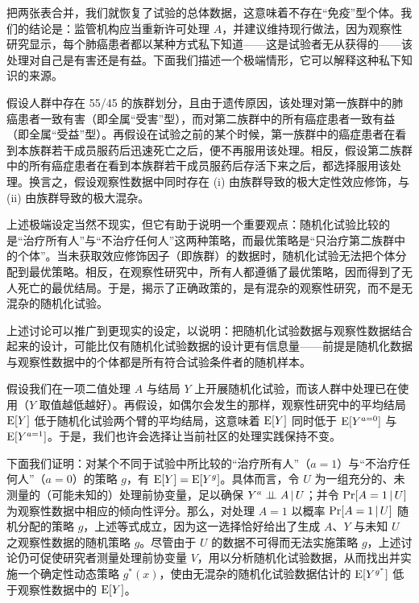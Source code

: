 \begin{finepoint}[随机化试验与观察性研究的一个反直觉比较]
把两张表合并，我们就恢复了试验的总体数据，这意味着不存在“免疫”型个体。我们的结论是：监管机构应当重新许可处理 $A$，并建议维持现行做法，因为观察性研究显示，每个肺癌患者都以某种方式私下知道——这是试验者无从获得的——该处理对自己是有害还是有益。下面我们描述一个极端情形，它可以解释这种私下知识的来源。

假设人群中存在 55/45 的族群划分，且由于遗传原因，该处理对第一族群中的肺癌患者一致有害（即全属“受害”型），而对第二族群中的所有癌症患者一致有益（即全属“受益”型）。再假设在试验之前的某个时候，第一族群中的癌症患者在看到本族群若干成员服药后迅速死亡之后，便不再服用该处理。相反，假设第二族群中的所有癌症患者在看到本族群若干成员服药后存活下来之后，都选择服用该处理。换言之，假设观察性数据中同时存在 (i) 由族群导致的极大定性效应修饰，与 (ii) 由族群导致的极大混杂。

上述极端设定当然不现实，但它有助于说明一个重要观点：随机化试验比较的是“治疗所有人”与“不治疗任何人”这两种策略，而最优策略是“只治疗第二族群中的个体”。当未获取效应修饰因子（即族群）的数据时，随机化试验无法把个体分配到最优策略。相反，在观察性研究中，所有人都遵循了最优策略，因而得到了无人死亡的最优结局。于是，揭示了正确政策的，是有混杂的观察性研究，而不是无混杂的随机化试验。
\end{finepoint}

\begin{finepoint}
上述讨论可以推广到更现实的设定，以说明：把随机化试验数据与观察性数据结合起来的设计，可能比仅有随机化试验数据的设计更有信息量——前提是随机化数据与观察性数据中的个体都是所有符合试验条件者的随机样本。

假设我们在一项二值处理 $A$ 与结局 $Y$ 上开展随机化试验，而该人群中处理已在使用（$Y$ 取值越低越好）。再假设，如偶尔会发生的那样，观察性研究中的平均结局 $\mathrm{E}[Y]$ 低于随机化试验两个臂的平均结局，这意味着 $\mathrm{E}[Y]$ 同时低于 $\mathrm{E}[Y^{a=0}]$ 与 $\mathrm{E}[Y^{a=1}]$。于是，我们也许会选择让当前社区的处理实践保持不变。

下面我们证明：对某个不同于试验中所比较的“治疗所有人”（$a=1$）与“不治疗任何人”（$a=0$）的策略 $g$，有 $\mathrm{E}[Y]=\mathrm{E}[Y^{g}]$。具体而言，令 $U$ 为一组充分的、未测量的（可能未知的）处理前协变量，足以确保 $Y^{a}\perp\!\!\!\perp A\,|\, U$；并令 $\Pr[A=1\,|\, U]$ 为观察性数据中相应的倾向性评分。那么，对处理 $A=1$ 以概率 $\Pr[A=1\,|\, U]$ 随机分配的策略 $g$，上述等式成立，因为这一选择恰好给出了生成 $A$、$Y$ 与未知 $U$ 之观察性数据的随机策略 $g$。尽管由于 $U$ 的数据不可得而无法实施策略 $g$，上述讨论仍可促使研究者测量处理前协变量 $V$，用以分析随机化试验数据，从而找出并实施一个确定性动态策略 $g^{*}(x)$，使由无混杂的随机化试验数据估计的 $\mathrm{E}[Y^{g^{*}}]$ 低于观察性数据中的 $\mathrm{E}[Y]$。
\end{finepoint}
